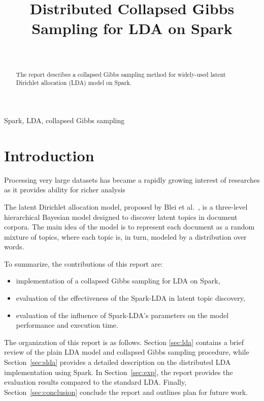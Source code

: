 \documentclass[journal]{IEEEtran}
\begin{document}
\title{Distributed Collapsed Gibbs Sampling for LDA on Spark}

\author{\\
}


\maketitle

\begin{abstract}
The report describes a collapsed Gibbs sampling method for widely-used latent Dirichlet allocation (LDA) model on Spark.
\end{abstract}


\begin{IEEEkeywords}
Spark, LDA, collapsed Gibbs sampling
\end{IEEEkeywords}


\section{Introduction}
Processing very large datasets has became a rapidly growing interest of researches as it provides ability for richer analysis

The latent Dirichlet allocation model, proposed by Blei et al.~\cite{blei2003latent}, is a three-level hierarchical Bayesian model designed to discover latent topics in document corpora. The main idea of the model is to represent each document as a random mixture of topics, where each topic is, in turn, modeled by a distribution over words. 

To summarize, the contributions of this report are:
\begin{itemize}
\item implementation of a collapsed Gibbs sampling for LDA on Spark,
\item evaluation of the effectiveness of the Spark-LDA in latent topic discovery,
\item evaluation of the influence of Spark-LDA's parameters on the model performance and execution time.
\end{itemize}
The organization of this report is as follows. Section \ref{sec:lda} contains a brief review of the plain LDA model and collapsed Gibbs sampling procedure, while Section~\ref{sec:slda} provides a detailed description on the distributed LDA implementation using Spark. In Section~\ref{sec:exp}, the report provides the evaluation results compared to the standard LDA. Finally, Section~\ref{sec:conclusion} conclude the report and outlines plan for future work.
\end{document}

